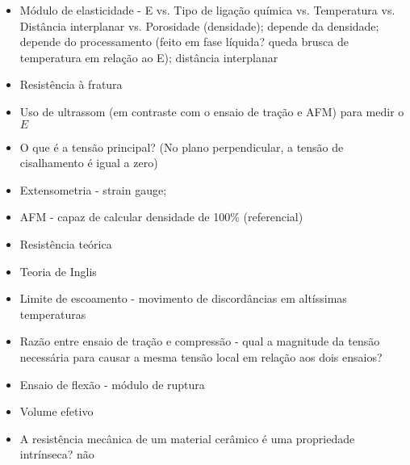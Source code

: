  \begin{itemize}
    \item Módulo de elasticidade - E vs. Tipo de ligação química vs. Temperatura vs. Distância interplanar vs. Porosidade (densidade); depende da densidade; depende do processamento (feito em fase líquida? queda brusca de temperatura em relação ao E); distância interplanar 
    \item Resistência à fratura
    \item Uso de ultrassom (em contraste com o ensaio de tração e AFM) para medir o $E$
    \item O que é a tensão principal? (No plano perpendicular, a tensão de cisalhamento é igual a zero)
    \item Extensometria - strain gauge;
    \item AFM - capaz de calcular densidade de 100\% (referencial)
    \item Resistência teórica
    \item Teoria de Inglis
    \item Limite de escoamento - movimento de discordâncias em altíssimas temperaturas
    \item Razão entre ensaio de tração e compressão - qual a magnitude da tensão necessária para causar a mesma tensão local em relação aos dois ensaios?
    \item Ensaio de flexão - módulo de ruptura
    \item Volume efetivo
    \item A resistência mecânica de um material cerâmico é uma propriedade intrínseca? não
  \end{itemize}

